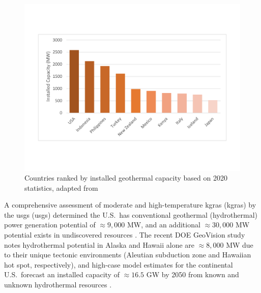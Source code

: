 \begin{figure}
\centering
\includegraphics[width=.8\textwidth]{templates/images/Figure-IRENA_statistics.pdf}
\caption[Country rankings for installed geothermal capacity]{Countries ranked by installed geothermal capacity based on 2020 statistics, adapted from \protect\citep{irena_country_2021}}
\label{fig:irena-rank}
\end{figure}

A comprehensive assessment of moderate and high-temperature \acrlong{kgra}s (\acrshort{kgra}s) by the \acrlong{usgs} (\acrshort{usgs}) determined the U.S.\ has conventional geothermal (hydrothermal) power generation potential of $\approx9,000$ MW, and an additional $\approx30,000$ MW potential exists in undiscovered resources \citep{williams_assessment_2008}. The recent DOE GeoVision study notes hydrothermal potential in Alaska and Hawaii alone are $\approx8,000$ MW due to their unique tectonic environments (Aleutian subduction zone and Hawaiian hot spot, respectively), and high-case model estimates for the continental U.S.\ forecast an installed capacity of $\approx16.5$ GW by 2050 from known and unknown hydrothermal resources \citep{augustine_geovision_2019,hamm_overview_2019}.

